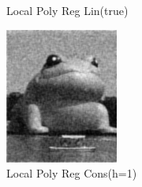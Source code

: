 \documentclass{article}
\begin{document}
\begin{figure}[htb]
\begin{subfigure}[b]{0.24\linewidth}
    \caption{Local Poly Reg Lin(true)}
  \end{subfigure}
  \begin{subfigure}[b]{0.24\linewidth}
    \includegraphics[width=\linewidth]{images/poly_nr_true.png}
    \caption{Local Poly Reg Cons(h=1)}
  \end{subfigure}
  \begin{subfigure}[b]{0.24\linewidth}

\end{subfigure}
\end{figure}
\end{document}
